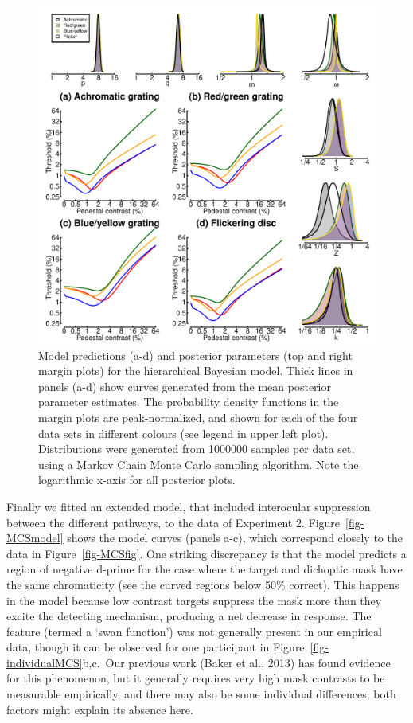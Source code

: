 \documentclass[
  letterpaper,
  DIV=11,
  numbers=noendperiod]{scrartcl}
\begin{document}
\begin{figure}

{\centering \includegraphics{Figures/stanoutput.pdf}

}

\caption{\label{fig-bayesianmodel}Model predictions (a-d) and posterior
parameters (top and right margin plots) for the hierarchical Bayesian
model. Thick lines in panels (a-d) show curves generated from the mean
posterior parameter estimates. The probability density functions in the
margin plots are peak-normalized, and shown for each of the four data
sets in different colours (see legend in upper left plot). Distributions
were generated from 1000000 samples per data set, using a Markov Chain
Monte Carlo sampling algorithm. Note the logarithmic x-axis for all
posterior plots.}

\end{figure}

Finally we fitted an extended model, that included interocular
suppression between the different pathways, to the data of Experiment 2.
Figure~\ref{fig-MCSmodel} shows the model curves (panels a-c), which
correspond closely to the data in Figure~\ref{fig-MCSfig}. One striking
discrepancy is that the model predicts a region of negative d-prime for
the case where the target and dichoptic mask have the same chromaticity
(see the curved regions below 50\% correct). This happens in the model
because low contrast targets suppress the mask more than they excite the
detecting mechanism, producing a net decrease in response. The feature
(termed a `swan function') was not generally present in our empirical
data, though it can be observed for one participant in
Figure~\ref{fig-individualMCS}b,c.~Our previous work (Baker et al.,
2013) has found evidence for this phenomenon, but it generally requires
very high mask contrasts to be measurable empirically, and there may
also be some individual differences; both factors might explain its
absence here.
\end{document}
